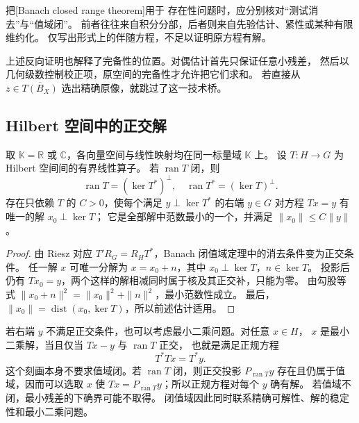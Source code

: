 把[Banach closed range theorem]用于
存在性问题时，应分别核对“测试消去”与“值域闭”。
前者往往来自积分分部，后者则来自先验估计、紧性或某种有限维约化。
仅写出形式上的伴随方程，不足以证明原方程有解。

\ProseParagraphBreak

上述反向证明也解释了完备性的位置。对偶估计首先只保证任意小残差，
然后以几何级数控制校正项，原空间的完备性才允许把它们求和。
若直接从 \(z\in\overline{T(B_X)}\) 选出精确原像，就跳过了这一技术桥。

\subsection{Hilbert 空间中的正交解}
\label{b1:subsec:C10303}

\begin{corollary}\label{b1:cor:C1-hilbert-closed-range}
取 \(\mathbb K=\mathbb R\) 或 \(\mathbb C\)，各向量空间与线性映射均在同一标量域 \(\mathbb K\) 上。
设 \(T:H\rightarrow G\) 为 Hilbert 空间间的有界线性算子。
若 \(\operatorname{ran}T\) 闭，则
\[
 \operatorname{ran}T=(\ker T^*)^\perp,\quad
 \operatorname{ran}T^*=(\ker T)^\perp.
\]
存在只依赖 \(T\) 的 \(C>0\)，使每个满足 \(y\perp\ker T^*\) 的右端 \(y\in G\) 对方程 \(Tx=y\) 有唯一的解 \(x_0\perp\ker T\)；
它是全部解中范数最小的一个，并满足 \(\|x_0\|\leq C\|y\|\)。
\end{corollary}
\begin{proof}
由 Riesz 对应 \(T'R_G=R_HT^*\)，Banach 闭值域定理中的消去条件变为正交条件。
任一解 \(x\) 可唯一分解为 \(x=x_0+n\)，其中 \(x_0\perp\ker T\)，\(n\in\ker T\)。
投影后仍有 \(Tx_0=y\)，两个这样的解相减同时属于核及其正交补，只能为零。
由勾股等式 \(\|x_0+n\|^2=\|x_0\|^2+\|n\|^2\)，最小范数性成立。
最后，\(\|x_0\|=\operatorname{dist}(x_0,\ker T)\)，所以前述估计适用。
\end{proof}

若右端 \(y\) 不满足正交条件，也可以考虑最小二乘问题。对任意 \(x\in H\)，
\(x\) 是最小二乘解，当且仅当 \(Tx-y\) 与 \(\operatorname{ran}T\) 正交，
也就是满足正规方程
\[
 T^*Tx=T^*y.
\]
这个刻画本身不要求值域闭。若 \(\operatorname{ran}T\) 闭，则正交投影
\(P_{\operatorname{ran}T}y\) 存在且仍属于值域，因而可以选取 \(x\) 使
\(Tx=P_{\operatorname{ran}T}y\)；所以正规方程对每个 \(y\) 确有解。
若值域不闭，最小残差的下确界可能不取得。
闭值域因此同时联系精确可解性、解的稳定性和最小二乘问题。
